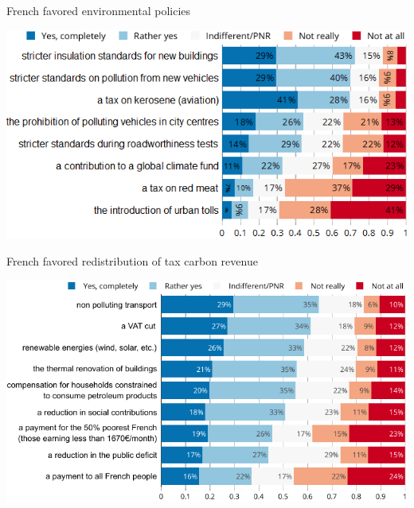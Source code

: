 \documentclass[aspectratio=169,9pt,dvipsnames]{beamer}
\begin{document}
    \begin{frame}{French favored environmental policies}\label{favored_environmental_policies}

\includegraphics[scale=0.6,center]{Images/environmental_policies.png}

\hyperlink{discussion}{}

    \end{frame}
    \begin{frame}{French favored redistribution of tax carbon revenue}

\includegraphics[scale=0.5,center]{Images/tax_condition_val.png}

\hyperlink{discussion}{}
    \end{frame}



\end{document}
